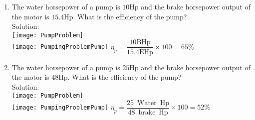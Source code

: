 \begin{enumerate}
\item The water horsepower of a pump is $10 \mathrm{Hp}$ and the brake horsepower output of the motor is $15.4 \mathrm{Hp}$. What is the efficiency of the pump?\\
\vspace{0.2cm}
Solution:\\ 
 \vspace{0.2cm}
 \vspace{0.4cm}\texttt{[image: PumpProblem]}\\
 \vspace{0.2cm}
 \texttt{[image: PumpingProblemPump]}
 $\eta_p=\dfrac{10 \mathrm{BHp}}{15.4 \mathrm{EHp}} \times 100=\boxed{65 \%}$\\
 \vspace{0.2cm}
 \item The water horsepower of a pump is $25 \mathrm{Hp}$ and the brake horsepower output of the motor is $48 \mathrm{Hp}$. What is the efficiency of the pump?\\
 Solution:\\
  \vspace{0.2cm}
 \vspace{0.32cm}\texttt{[image: PumpProblem]}\\
 \vspace{0.2cm}
 \texttt{[image: PumpingProblemPump]}
 \vspace{0.2cm}
$\eta_p=\dfrac{25 \mathrm{\enspace Water \enspace Hp}}{48 \mathrm{\enspace brake \enspace Hp}} \times 100=\boxed{52 \%}$
  \vspace{0.4cm}
\end{enumerate}

